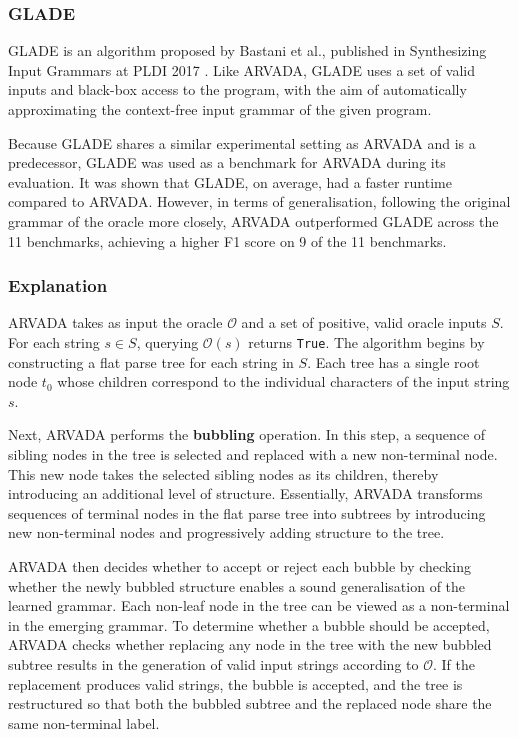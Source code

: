 \subsubsection{GLADE}
GLADE is an algorithm proposed by Bastani et al., published in Synthesizing Input Grammars at PLDI 2017 \cite{bastaniSynthesizingProgramInput}. Like ARVADA, GLADE uses a set of valid inputs and black-box access to the program, with the aim of automatically approximating the context-free input grammar of the given program.

\vspace{\baselineskip}

Because GLADE shares a similar experimental setting as ARVADA and is a predecessor, GLADE was used as a benchmark for ARVADA during its evaluation. It was shown that GLADE, on average, had a faster runtime compared to ARVADA. However, in terms of generalisation, following the original grammar of the oracle more closely, ARVADA outperformed GLADE across the 11 benchmarks, achieving a higher F1 score on 9 of the 11 benchmarks.

\subsubsection{Explanation}

ARVADA takes as input the oracle $\mathcal{O}$ and a set of positive, valid oracle inputs $S$. For each string $s \in S$, querying $\mathcal{O}(s)$ returns \verb|True|. The algorithm begins by constructing a flat parse tree for each string in $S$. Each tree has a single root node $t_0$ whose children correspond to the individual characters of the input string $s$.

\vspace{\baselineskip}
Next, ARVADA performs the \textbf{bubbling} operation. In this step, a sequence of sibling nodes in the tree is selected and replaced with a new non-terminal node. This new node takes the selected sibling nodes as its children, thereby introducing an additional level of structure. Essentially, ARVADA transforms sequences of terminal nodes in the flat parse tree into subtrees by introducing new non-terminal nodes and progressively adding structure to the tree.

\vspace{\baselineskip}
ARVADA then decides whether to accept or reject each bubble by checking whether the newly bubbled structure enables a sound generalisation of the learned grammar. Each non-leaf node in the tree can be viewed as a non-terminal in the emerging grammar. To determine whether a bubble should be accepted, ARVADA checks whether replacing any node in the tree with the new bubbled subtree results in the generation of valid input strings according to $\mathcal{O}$. If the replacement produces valid strings, the bubble is accepted, and the tree is restructured so that both the bubbled subtree and the replaced node share the same non-terminal label.

